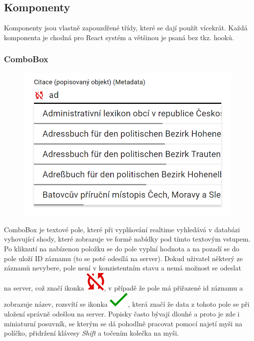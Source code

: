 \subsection{Komponenty}
Komponenty jsou vlastně zapouzdřené třídy, které se dají použít vícekrát.
Každá komponenta je chodná pro React systém a většinou je psaná bez tkz. hooků.

\subsubsection{ComboBox}
\begin{figure}
	\centering
	\includegraphics[width=\linewidth]{img/ComboBox.png}
\end{figure}
ComboBox je textové pole, které při vyplňování realtime vyhledává v databázi vyhovující shody,
které zobrazuje ve formě nabídky pod tímto textovým vstupem. Po kliknutí na nabízenou položku se
do pole vyplní hodnota a na pozadí se do pole uloží ID záznamu (to se poté odesílá na server).
Dokud uživatel některý ze záznamů nevybere, pole není v konzistentním stavu a nemá možnost se
odeslat na server, což značí ikonka
\includegraphics[height=\fontcharht\font`\B]{img/notSynced.png},
v případě že pole má přiřazené id záznamu a zobrazuje název, rozsvítí se ikonka
\includegraphics[height=\fontcharht\font`\B]{img/synced.png},
která značí že data z tohoto pole se při uložení správně odešlou na server.
Popisky často bývají dlouhé a proto je zde i miniaturní posuvník, se kterým se
dá pohodlně pracovat pomocí najetí myši na políčko, přidržení klávesy \textit{Shift} a
točením kolečka na myši.

